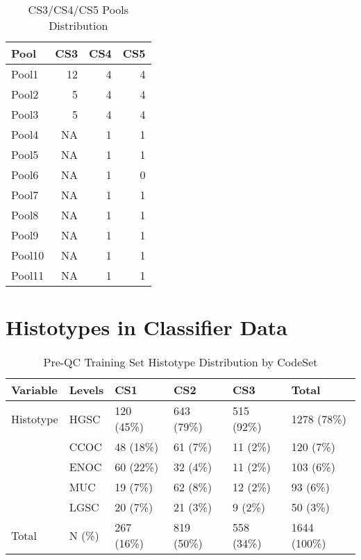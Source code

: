 \documentclass[
]{report}
\begin{document}
\begin{table}

\caption{\label{tab:cs345-pools}CS3/CS4/CS5 Pools Distribution}
\centering
\begin{tabular}[t]{l|r|r|r}
\hline
Pool & CS3 & CS4 & CS5\\
\hline
Pool1 & 12 & 4 & 4\\
\hline
Pool2 & 5 & 4 & 4\\
\hline
Pool3 & 5 & 4 & 4\\
\hline
Pool4 & NA & 1 & 1\\
\hline
Pool5 & NA & 1 & 1\\
\hline
Pool6 & NA & 1 & 0\\
\hline
Pool7 & NA & 1 & 1\\
\hline
Pool8 & NA & 1 & 1\\
\hline
Pool9 & NA & 1 & 1\\
\hline
Pool10 & NA & 1 & 1\\
\hline
Pool11 & NA & 1 & 1\\
\hline
\end{tabular}
\end{table}

\hypertarget{histotypes-in-classifier-data}{%
\section{Histotypes in Classifier Data}\label{histotypes-in-classifier-data}}

\begin{table}

\caption{\label{tab:preqc-hist-codeset}Pre-QC Training Set Histotype Distribution by CodeSet}
\centering
\begin{tabular}[t]{l|l|l|l|l|l}
\hline
Variable & Levels & CS1 & CS2 & CS3 & Total\\
\hline
Histotype & HGSC & 120 (45\%) & 643 (79\%) & 515 (92\%) & 1278 (78\%)\\
\hline
 & CCOC & 48 (18\%) & 61 (7\%) & 11 (2\%) & 120 (7\%)\\
\hline
 & ENOC & 60 (22\%) & 32 (4\%) & 11 (2\%) & 103 (6\%)\\
\hline
 & MUC & 19 (7\%) & 62 (8\%) & 12 (2\%) & 93 (6\%)\\
\hline
 & LGSC & 20 (7\%) & 21 (3\%) & 9 (2\%) & 50 (3\%)\\
\hline
Total & N (\%) & 267 (16\%) & 819 (50\%) & 558 (34\%) & 1644 (100\%)\\
\hline
\end{tabular}
\end{table}
\end{document}

